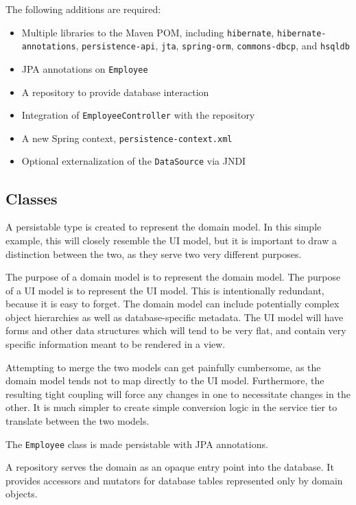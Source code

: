 \documentclass{article}
\begin{document}
The following additions are required:

\begin{itemize}
\item Multiple libraries to the Maven POM, including \texttt{hibernate}, \texttt{hibernate-annotations}, \texttt{persistence-api}, \texttt{jta}, \texttt{spring-orm}, \texttt{commons-dbcp}, and \texttt{hsqldb}
\item JPA annotations on \texttt{Employee}
\item A repository to provide database interaction
\item Integration of \texttt{EmployeeController} with the repository
\item A new Spring context, \texttt{persistence-context.xml}
\item Optional externalization of the \texttt{DataSource} via JNDI
\end{itemize}

\subsection{Classes}

A persistable type is created to represent the domain model.  In this simple example, this will closely resemble the UI model, but it is important to draw a distinction between the two, as they serve two very different purposes.

The purpose of a domain model is to represent the domain model.  The purpose of a UI model is to represent the UI model.  This is intentionally redundant, because it is easy to forget.  The domain model can include potentially complex object hierarchies as well as database-specific metadata.  The UI model will have forms and other data structures which will tend to be very flat, and contain very specific information meant to be rendered in a view.

Attempting to merge the two models can get painfully cumbersome, as the domain model tends not to map directly to the UI model.  Furthermore, the resulting tight coupling will force any changes in one to necessitate changes in the other.  It is much simpler to create simple conversion logic in the service tier to translate between the two models.

The \texttt{Employee} class is made persistable with JPA annotations.



A repository serves the domain as an opaque entry point into the database.  It provides accessors and mutators for database tables represented only by domain objects.
\end{document}
